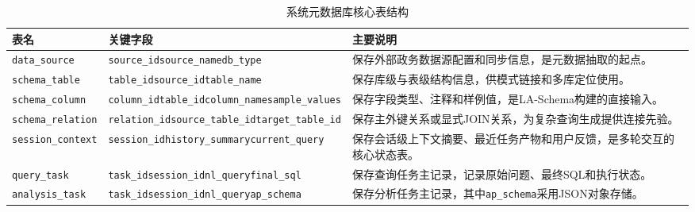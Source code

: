 \begin{table}[!t]
	\setlength{\abovecaptionskip}{5pt}
	\setlength{\belowcaptionskip}{5pt}
	\caption{系统元数据库核心表结构}\label{tab:chap05_metadata_tables}
	\centering
	\scriptsize
	\renewcommand{\arraystretch}{1.3}
	\begin{tabular}{>{\centering\arraybackslash}m{3.4cm}>{\raggedright\arraybackslash}m{3.3cm}m{5.6cm}}
		\toprule
		表名 & 关键字段 & 主要说明 \\
		\midrule
		\texttt{data\_source} & \texttt{source\_id}\newline\texttt{source\_name}\newline\texttt{db\_type} & 保存外部政务数据源配置和同步信息，是元数据抽取的起点。 \\
		\texttt{schema\_table} & \texttt{table\_id}\newline\texttt{source\_id}\newline\texttt{table\_name} & 保存库级与表级结构信息，供模式链接和多库定位使用。 \\
		\texttt{schema\_column} & \texttt{column\_id}\newline\texttt{table\_id}\newline\texttt{column\_name}\newline\texttt{sample\_values} & 保存字段类型、注释和样例值，是LA-Schema构建的直接输入。 \\
		\texttt{schema\_relation} & \texttt{relation\_id}\newline\texttt{source\_table\_id}\newline\texttt{target\_table\_id} & 保存主外键关系或显式JOIN关系，为复杂查询生成提供连接先验。 \\
		\texttt{session\_context} & \texttt{session\_id}\newline\texttt{history\_summary}\newline\texttt{current\_query} & 保存会话级上下文摘要、最近任务产物和用户反馈，是多轮交互的核心状态表。 \\
		\texttt{query\_task} & \texttt{task\_id}\newline\texttt{session\_id}\newline\texttt{nl\_query}\newline\texttt{final\_sql} & 保存查询任务主记录，记录原始问题、最终SQL和执行状态。 \\
		\texttt{analysis\_task} & \texttt{task\_id}\newline\texttt{session\_id}\newline\texttt{nl\_query}\newline\texttt{ap\_schema} & 保存分析任务主记录，其中\texttt{ap\_schema}采用JSON对象存储。 \\

\end{tabular}
\end{table}
